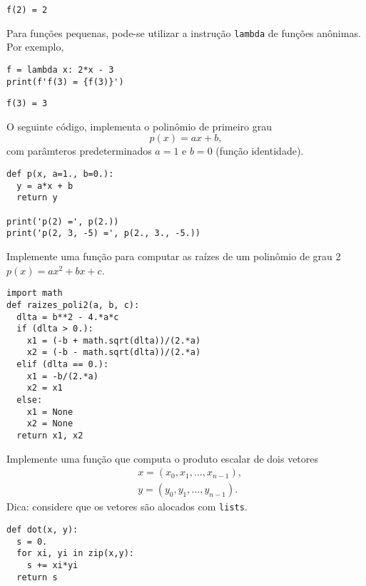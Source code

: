 \begin{verbatim}
f(2) = 2
\end{verbatim}

\begin{obs}
  Para funções pequenas, pode-se utilizar a instrução \texttt{lambda} de funções anônimas. Por exemplo,

\begin{lstlisting}
f = lambda x: 2*x - 3
print(f'f(3) = {f(3)}')
\end{lstlisting}

\begin{verbatim}
f(3) = 3
\end{verbatim}

\end{obs}

\begin{ex}
  O seguinte código, implementa o polinômio de primeiro grau
  \begin{equation}
    p(x) = ax + b,
  \end{equation}
  com parâmteros predeterminados $a=1$ e $b=0$ (função identidade).

\begin{lstlisting}
def p(x, a=1., b=0.):
  y = a*x + b
  return y

print('p(2) =', p(2.))
print('p(2, 3, -5) =', p(2., 3., -5.))
\end{lstlisting}

\end{ex}

\begin{exer}
  Implemente uma função para computar as raízes de um polinômio de grau 2 $p(x) = ax^2 + bx + c$.
\end{exer}
\begin{resp}

\begin{lstlisting}
import math
def raizes_poli2(a, b, c):
  dlta = b**2 - 4.*a*c
  if (dlta > 0.):
    x1 = (-b + math.sqrt(dlta))/(2.*a)
    x2 = (-b - math.sqrt(dlta))/(2.*a)
  elif (dlta == 0.):
    x1 = -b/(2.*a)
    x2 = x1
  else:
    x1 = None
    x2 = None
  return x1, x2  
\end{lstlisting}

\end{resp}

\begin{exer}
  Implemente uma função que computa o produto escalar de dois vetores
  \begin{align}
    &x = (x_0, x_1, \ldots, x_{n-1}),\\
    &y = (y_0, y_1, \ldots, y_{n-1}).
  \end{align}
  Dica: considere que os vetores são alocados com \texttt{lists}.
\end{exer}
\begin{resp}
  
\begin{lstlisting}
def dot(x, y):
  s = 0.
  for xi, yi in zip(x,y):
    s += xi*yi
  return s
\end{lstlisting}

\end{resp}

